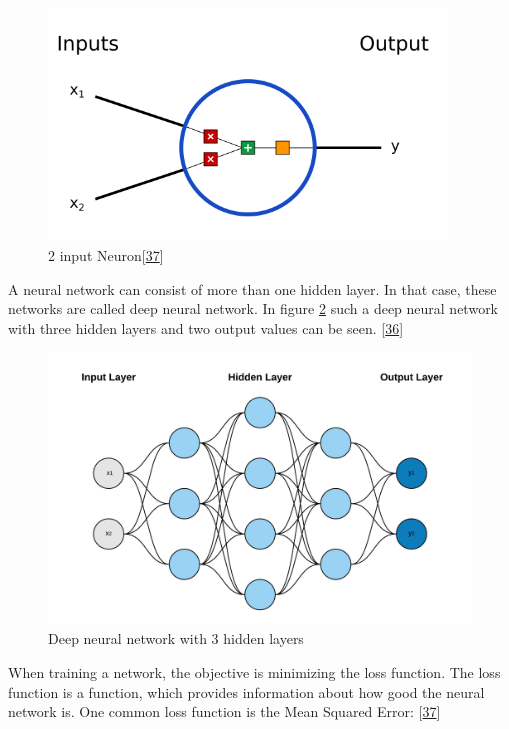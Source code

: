 \documentclass[12pt,english,a4paper,oneside,,tablecaptionabove]{scrbook}
\begin{document}
\begin{figure}
\hypertarget{fig:neuron}{%
\centering
\includegraphics[width=4.16667in,height=\textheight]{images/chapter2/neuron.png}
\caption{2 input
Neuron{[}\protect\hyperlink{ref-VictorZhou}{37}{]}}\label{fig:neuron}
}
\end{figure}

A neural network can consist of more than one hidden layer. In that
case, these networks are called deep neural network. In figure
\ref{fig:deep_nn} such a deep neural network with three hidden layers
and two output values can be seen.
{[}\protect\hyperlink{ref-Stroetmann2018}{36}{]}

\begin{figure}
\hypertarget{fig:deep_nn}{%
\centering
\includegraphics[width=5.20833in,height=\textheight]{images/chapter2/deep_neural_net.png}
\caption{Deep neural network with 3 hidden layers}\label{fig:deep_nn}
}
\end{figure}

When training a network, the objective is minimizing the loss function.
The loss function is a function, which provides information about how
good the neural network is. One common loss function is the Mean Squared
Error: {[}\protect\hyperlink{ref-VictorZhou}{37}{]}
\end{document}
